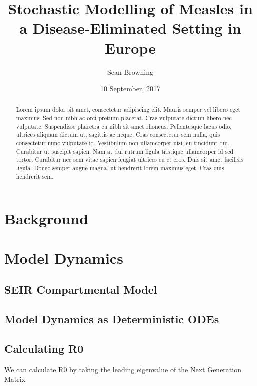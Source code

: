\documentclass[11pt, a4paper]{article}
\begin{document}
\title{Stochastic Modelling of Measles in a Disease-Eliminated Setting in Europe}
\author{Sean Browning}
\date{10 September, 2017}
\maketitle
\onehalfspace
\begin{abstract}
Lorem ipsum dolor sit amet, consectetur adipiscing elit. Mauris semper vel libero
eget maximus. Sed non nibh ac orci pretium placerat. Cras vulputate dictum libero
nec vulputate. Suspendisse pharetra eu nibh sit amet rhoncus. Pellentesque lacus
odio, ultrices aliquam dictum ut, sagittis ac neque. Cras consectetur sem nulla,
quis consectetur nunc vulputate id. Vestibulum non ullamcorper nisi, eu tincidunt
dui. Curabitur ut suscipit sapien. Nam at dui rutrum ligula tristique ullamcorper
id sed tortor. Curabitur nec sem vitae sapien feugiat ultrices eu et eros.
Duis sit amet facilisis ligula. Donec semper augue magna, ut hendrerit lorem
maximus eget. Cras quis hendrerit sem.
\end{abstract}
\clearpage
\tableofcontents
\clearpage
\section{Background}

\section{Model Dynamics}
\subsection{SEIR Compartmental Model}

\subsection{Model Dynamics as Deterministic ODEs}

\subsection{Calculating R0}
\par
We can calculate R0 by taking the leading eigenvalue of the Next Generation Matrix
\clearpage
\end{document}
